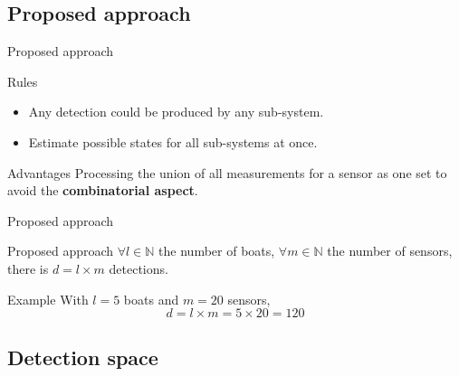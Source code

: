 \documentclass{beamer}
\begin{document}
        \subsection{Proposed approach}

            \begin{frame}{Proposed approach}
                \begin{block}{Rules}
                    \begin{itemize}
                        \item Any detection could be produced by any sub-system.
                        \item Estimate possible states for all sub-systems at once.
                    \end{itemize}
                \end{block}
                \begin{block}{Advantages}
                    Processing the union of all measurements for a sensor as one set to avoid the \textbf{combinatorial aspect}.
                \end{block}
            \end{frame}

            \begin{frame}{Proposed approach}
                \begin{block}{Proposed approach}
                    $\forall l \in \mathbb{N}$ the number of boats, $\forall m \in \mathbb{N}$ the number of sensors, there is $d = l \times m$ detections.
                \end{block}
                \begin{exampleblock}{Example}
                    With $l = 5$ boats and $m = 20$ sensors,
                    $$d = l \times m = 5 \times 20 = 120$$
                \end{exampleblock}
            \end{frame}

        \subsection{Detection space}
\end{document}
